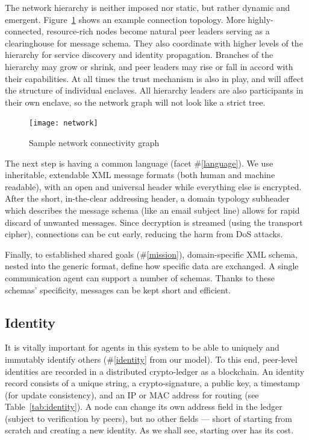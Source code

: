 The network hierarchy is neither imposed nor static, but rather dynamic and emergent.
Figure~\ref{fig:network} shows an example connection topology.
More highly-connected, resource-rich nodes become natural peer leaders serving as a clearinghouse for message schema.
They also coordinate with higher levels of the hierarchy for service discovery and identity propagation.
Branches of the hierarchy may grow or shrink, and peer leaders may rise or fall in accord with their capabilities.
At all times the trust mechanism is also in play, and will affect the structure of individual enclaves.
All hierarchy leaders are also participants in their own enclave, so the network graph will not look like a strict tree.

\begin{figure}
	\centering
	\texttt{[image: network]}
	\caption{Sample network connectivity graph}
	\label{fig:network}
\end{figure}


The next step is having a common language (facet \#\ref{language}). We use inheritable, extendable XML message formats (both human and machine readable), with an open and universal header while everything else is encrypted.
After the short, in-the-clear addressing header, a domain typology subheader which describes the message schema (like an email subject line) allows for rapid discard of unwanted messages.
Since decryption is streamed (using the transport cipher), connections can be cut early, reducing the harm from DoS attacks.

Finally, to established shared goals (\#\ref{mission}), domain-specific XML schema, nested into the generic format, define how specific data are exchanged.
A single communication agent can support a number of schemas.
Thanks to these schemas' specificity, messages can be kept short and efficient.

\begin{ppl}

\end{ppl}


\subsection{Identity}\label{subsec:id}

It is vitally important for agents in this system to be able to uniquely and immutably identify others (\#\ref{identity} from our model).
To this end, peer-level identities are recorded in a distributed crypto-ledger as a blockchain.
An identity record consists of a unique string, a crypto-signature, a public key, a timestamp (for update consistency), and an IP or MAC address for routing (see Table~\ref{tab:identity}).
A node can change its own address field in the ledger (subject to verification by peers), but no other fields --- short of starting from scratch and creating a new identity.
As we shall see, starting over has its cost.

